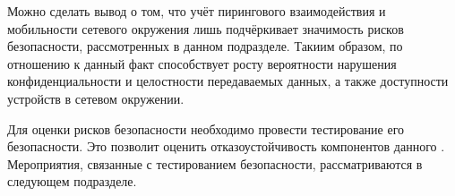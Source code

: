 %
Можно сделать вывод о том, что учёт пирингового взаимодействия и мобильности сетевого окружения лишь подчёркивает значимость рисков безопасности, рассмотренных в данном подразделе. 
%
Такиим образом, по отношению к  данный факт способствует росту вероятности нарушения конфиденциальности и целостности передаваемых данных, а также доступности устройств в сетевом окружении. 

%
Для оценки рисков безопасности  необходимо провести тестирование его безопасности. 
%
Это позволит оценить отказоустойчивость компонентов данного . 
%
Мероприятия, связанные с тестированием безопасности, рассматриваются в следующем подразделе. 